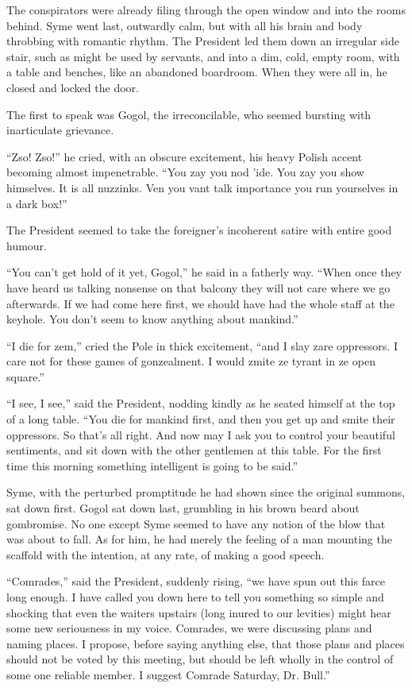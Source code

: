 The conspirators were already filing through the open window and into the rooms behind. Syme went last, outwardly calm, but with all his brain and body throbbing with romantic rhythm. The President led them down an irregular side stair, such as might be used by servants, and into a dim, cold, empty room, with a table and benches, like an abandoned boardroom. When they were all in, he closed and locked the door.

The first to speak was Gogol, the irreconcilable, who seemed bursting with inarticulate grievance.

“Zso! Zso!” he cried, with an obscure excitement, his heavy Polish accent becoming almost impenetrable. “You zay you nod ’ide. You zay you show himselves. It is all nuzzinks. Ven you vant talk importance you run yourselves in a dark box!”

The President seemed to take the foreigner’s incoherent satire with entire good humour.

“You can’t get hold of it yet, Gogol,” he said in a fatherly way. “When once they have heard us talking nonsense on that balcony they will not care where we go afterwards. If we had come here first, we should have had the whole staff at the keyhole. You don’t seem to know anything about mankind.”

“I die for zem,” cried the Pole in thick excitement, “and I slay zare oppressors. I care not for these games of gonzealment. I would zmite ze tyrant in ze open square.”

“I see, I see,” said the President, nodding kindly as he seated himself at the top of a long table. “You die for mankind first, and then you get up and smite their oppressors. So that’s all right. And now may I ask you to control your beautiful sentiments, and sit down with the other gentlemen at this table. For the first time this morning something intelligent is going to be said.”

Syme, with the perturbed promptitude he had shown since the original summons, sat down first. Gogol sat down last, grumbling in his brown beard about gombromise. No one except Syme seemed to have any notion of the blow that was about to fall. As for him, he had merely the feeling of a man mounting the scaffold with the intention, at any rate, of making a good speech.

“Comrades,” said the President, suddenly rising, “we have spun out this farce long enough. I have called you down here to tell you something so simple and shocking that even the waiters upstairs (long inured to our levities) might hear some new seriousness in my voice. Comrades, we were discussing plans and naming places. I propose, before saying anything else, that those plans and places should not be voted by this meeting, but should be left wholly in the control of some one reliable member. I suggest Comrade Saturday, Dr. Bull.”

